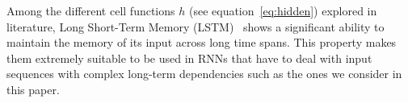 
Among the different cell functions $h$ (see equation~\eqref{eq:hidden}) explored in literature, Long Short-Term
Memory (LSTM)~\cite{hochreiter1997long} shows a significant ability to maintain the memory of its input across long time spans. This property makes them extremely suitable to be used in RNNs that have to deal with input sequences with complex long-term dependencies such as the ones we consider in this paper.

